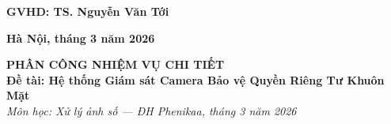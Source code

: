 \documentclass[12pt,a4paper]{article}
\numberwithin{equation}{section}
\numberwithin{figure}{section}
\numberwithin{table}{section}
\begin{document}
\vspace{0.6cm}

\begin{center}
    \textbf{GVHD: TS. Nguyễn Văn Tới}
\end{center}

\vfill

\begin{center}
    \textbf{Hà Nội, tháng 3 năm 2026}
\end{center}
\newpage
\thispagestyle{empty}
\begin{center}
    {\large\textbf{PHÂN CÔNG NHIỆM VỤ CHI TIẾT}}\\[0.6cm]
    \textbf{Đề tài: Hệ thống Giám sát Camera Bảo vệ Quyền Riêng Tư Khuôn Mặt}\\[0.2cm]
    \textit{Môn học: Xử lý ảnh số --- ĐH Phenikaa, tháng 3 năm 2026}
\end{center}
\vspace{0.4cm}
\end{document}
